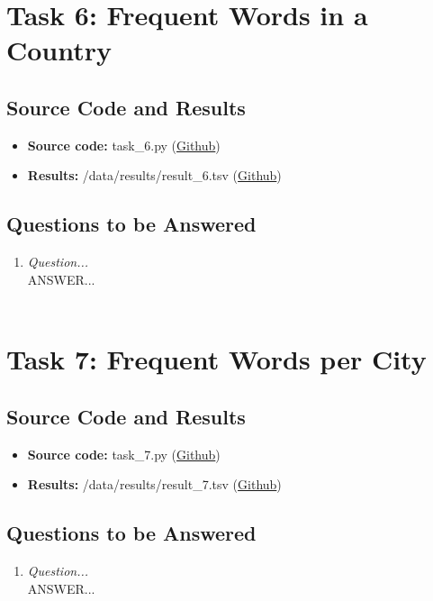 \documentclass{article}
\begin{document}
\section*{Task 6: Frequent Words in a Country}
\subsection*{Source Code and Results}
    \begin{itemize}
        \item \textbf{Source code:} task\_6.py (\href{https://github.com/FredrikBakken/TDT4305_Big-Data-Project/blob/master/PhaseOne/task_6.py}{Github})
        \item \textbf{Results:} /data/results/result\_6.tsv (\href{https://github.com/FredrikBakken/TDT4305_Big-Data-Project/blob/master/PhaseOne/data/results/result_6.tsv}{Github})
    \end{itemize}

\subsection*{Questions to be Answered}
\begin{enumerate}[label=\alph*)]
    \item \textit{Question...}\\
    
    ANSWER...\\ \\
\end{enumerate}

\section*{Task 7: Frequent Words per City}
\subsection*{Source Code and Results}
    \begin{itemize}
        \item \textbf{Source code:} task\_7.py (\href{https://github.com/FredrikBakken/TDT4305_Big-Data-Project/blob/master/PhaseOne/task_7.py}{Github})
        \item \textbf{Results:} /data/results/result\_7.tsv (\href{https://github.com/FredrikBakken/TDT4305_Big-Data-Project/blob/master/PhaseOne/data/results/result_7.tsv}{Github})
    \end{itemize}

\subsection*{Questions to be Answered}
\begin{enumerate}[label=\alph*)]
    \item \textit{Question...}\\
    
    ANSWER...\\ \\
\end{enumerate}
\end{document}
